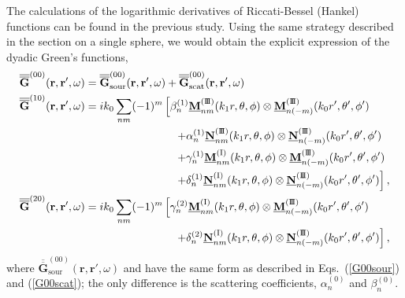 \documentclass[journal=jacsat,manuscript=article,layout=traditional]{achemso}
\newcommand*\tensorg{\overline{\overline{\mathbf{G}}}}
\newcommand{\norF}[1]{\underline{\vb{#1}}}
\newcommand{\joinR}{\hspace{-.17em}}
\newcommand{\RomanI}{\scriptsize\textrm{I}}
\newcommand{\RomanIII}{\mbox{\RomanI\joinR\RomanI\joinR\RomanI}}
\begin{document}
The calculations of the logarithmic derivatives of Riccati-Bessel (Hankel) functions can be found in the previous study.\cite{jia2016calculation}
Using the same strategy described in the section on a single sphere, we would obtain the explicit expression of the dyadic Green's functions,
\begin{align}
    \tensorg^{(00)}(\mathbf{r,r'},\omega)&=
    \tensorg_\mathrm{sour}^{(00)}(\mathbf{r,r'},\omega)+
    \tensorg_\mathrm{scat}^{(00)}(\mathbf{r,r'},\omega)\\
    \nonumber
    \tensorg^{(10)}(\mathbf{r,r'},\omega)&=
    ik_0 \sum_{nm}(-1)^m
    \left[\beta_n^{(1)}\norF{M}_{\mathstrut{nm}}^{(\RomanIII)}(k_1r,\theta,\phi)
    \otimes\norF{M}_{n(-m)}^{(\RomanIII)}(k_0r',\theta',\phi')\right.\\
    &\hspace{2.85 cm}
    \left.+\alpha_n^{(1)}\norF{N}_{\mathstrut{nm}}^{(\RomanIII)}(k_1r,\theta,\phi)\otimes\norF{N}_{n(-m)}^{(\RomanIII)}(k_0r',\theta',\phi')\right.\\
    &\hspace{2.85 cm}
    \left.+\gamma_n^{(1)}\norF{M}_{\mathstrut{nm}}^{(\RomanI)}(k_1r,\theta,\phi)
    \otimes\norF{M}_{n(-m)}^{(\RomanIII)}(k_0r',\theta',\phi')\right.\\
    &\hspace{2.85 cm}
    \left.+\delta_n^{(1)}\norF{N}_{\mathstrut{nm}}^{(\RomanI)}(k_1r,\theta,\phi)\otimes
    \norF{N}_{n(-m)}^{(\RomanIII)}(k_0r',\theta',\phi')\right],\\
    \nonumber
    \tensorg^{(20)}(\mathbf{r,r'},\omega)&=
    ik_0 \sum_{nm}(-1)^m
    \left[\gamma_n^{(2)}\norF{M}_{\mathstrut{nm}}^{(\RomanI)}(k_1r,\theta,\phi)
    \otimes\norF{M}_{n(-m)}^{(\RomanIII)}(k_0r',\theta',\phi')\right.\\
    &\hspace{2.85 cm}
    \left.+\delta_n^{(2)}\norF{N}_{\mathstrut{nm}}^{(\RomanI)}(k_1r,\theta,\phi)\otimes
    \norF{N}_{n(-m)}^{(\RomanIII)}(k_0r',\theta',\phi')\right],
\end{align}
where $\tensorg_\mathrm{sour}^{(00)}(\mathbf{r,r'},\omega)$ and have the same form as described in Eqs.~(\ref{G00sour}) and (\ref{G00scat}); the only difference is the scattering coefficients, $\alpha_n^{(0)}$ and $\beta_n^{(0)}$.
\newpage
\end{document}
